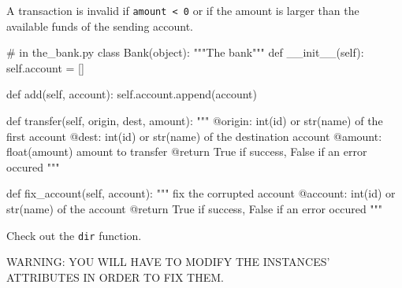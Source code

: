 \documentclass[]{article}
\newenvironment{Shaded}{\begin{snugshade}}{\end{snugshade}}
\newcommand{\BuiltInTok}[1]{\textcolor[rgb]{0.50,0.55,0.55}{#1}}
\newcommand{\CommentTok}[1]{\textcolor[rgb]{0.48,0.49,0.49}{#1}}
\newcommand{\FunctionTok}[1]{\textcolor[rgb]{0.56,0.27,0.68}{#1}}
\newcommand{\KeywordTok}[1]{\textcolor[rgb]{0.81,0.81,0.76}{#1}}
\newcommand{\NormalTok}[1]{\textcolor[rgb]{0.81,0.81,0.76}{#1}}
\newcommand{\OperatorTok}[1]{\textcolor[rgb]{0.81,0.81,0.76}{#1}}
\newcommand{\VariableTok}[1]{\textcolor[rgb]{0.15,0.68,0.68}{#1}}
\begin{document}
A transaction is invalid if \texttt{amount\ \textless{}\ 0} or if the
amount is larger than the available funds of the sending account.

\begin{Shaded}
\begin{Highlighting}[]
\CommentTok{# in the_bank.py}
\KeywordTok{class}\NormalTok{ Bank(}\BuiltInTok{object}\NormalTok{):}
    \CommentTok{"""The bank"""}
    \KeywordTok{def} \FunctionTok{__init__}\NormalTok{(}\VariableTok{self}\NormalTok{):}
        \VariableTok{self}\NormalTok{.account }\OperatorTok{=}\NormalTok{ []}

    \KeywordTok{def}\NormalTok{ add(}\VariableTok{self}\NormalTok{, account):}
        \VariableTok{self}\NormalTok{.account.append(account)}

    \KeywordTok{def}\NormalTok{ transfer(}\VariableTok{self}\NormalTok{, origin, dest, amount):}
        \CommentTok{"""}
\CommentTok{            @origin:  int(id) or str(name) of the first account}
\CommentTok{            @dest:    int(id) or str(name) of the destination account}
\CommentTok{            @amount:  float(amount) amount to transfer}
\CommentTok{            @return         True if success, False if an error occured}
\CommentTok{        """}

    \KeywordTok{def}\NormalTok{ fix_account(}\VariableTok{self}\NormalTok{, account):}
        \CommentTok{"""}
\CommentTok{            fix the corrupted account}
\CommentTok{            @account: int(id) or str(name) of the account}
\CommentTok{            @return         True if success, False if an error occured}
\CommentTok{        """}
\end{Highlighting}
\end{Shaded}

Check out the \texttt{dir} function.

WARNING: YOU WILL HAVE TO MODIFY THE INSTANCES' ATTRIBUTES IN ORDER TO
FIX THEM.

\clearpage
\end{document}
